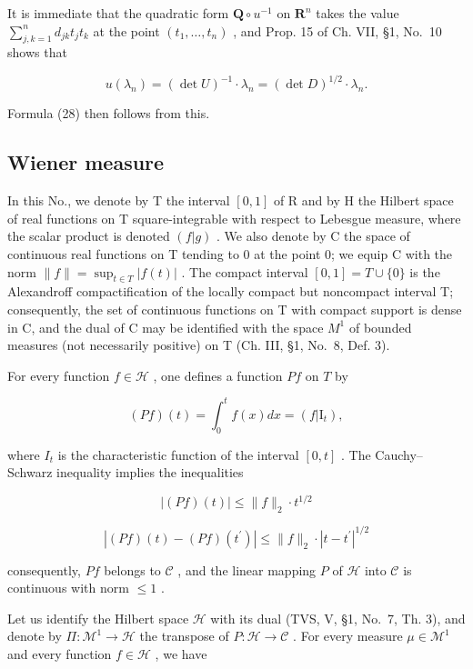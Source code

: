It is immediate that the quadratic form \(\mathbf{Q} \circ u^{-1}\) on \(\mathbf{R}^n\) takes the value \(\sum_{j,k=1}^{n} d_{jk} t_j t_k\) at the point \((t_1, \ldots, t_n)\) , and Prop. 15 of Ch. VII, §1, No.~10 shows that

\[
u (\lambda_ {n}) = (\det U) ^ {- 1} \cdot \lambda_ {n} = (\det D) ^ {1 / 2} \cdot \lambda_ {n}.\tag{30}
\]

Formula (28) then follows from this.

\subsection{Wiener measure}

In this No., we denote by T the interval \([0,1]\) of R and by H the Hilbert space of real functions on T square-integrable with respect to Lebesgue measure, where the scalar product is denoted \((f|g)\) . We also denote by C the space of continuous real functions on T tending to 0 at the point 0; we equip C with the norm \(\|f\| = \sup_{t \in T} |f(t)|\) . The compact interval \([0,1] = T \cup \{0\}\) is the Alexandroff compactification of the locally compact but noncompact interval T; consequently, the set of continuous functions on T with compact support is dense in C, and the dual of C may be identified with the space \(M^{1}\) of bounded measures (not necessarily positive) on T (Ch. III, §1, No.~8, Def. 3).

For every function \(f \in \mathcal{H}\) , one defines a function \(Pf\) on \(T\) by

\[
(P f) (t) = \int_ {0} ^ {t} f (x) d x = (f | \mathrm{I} _ {t}),\tag{31}
\]

where \(I_{t}\) is the characteristic function of the interval \([0, t]\) . The Cauchy--Schwarz inequality implies the inequalities

\[
| (P f) (t) | \leqslant \| f \| _ {2} \cdot t ^ {1 / 2}\tag{32}
\]

\[
\left| (P f) (t) - (P f) \left(t ^ {\prime}\right) \right| \leqslant \| f \| _ {2} \cdot \left| t - t ^ {\prime} \right| ^ {1 / 2}\tag{33}
\]

consequently, \(Pf\) belongs to \(\mathcal{C}\) , and the linear mapping \(P\) of \(\mathcal{H}\) into \(\mathcal{C}\) is continuous with norm \(\leqslant 1\) .

Let us identify the Hilbert space \(\mathcal{H}\) with its dual (TVS, V, §1, No.~7, Th. 3), and denote by \(\Pi : \mathcal{M}^1 \to \mathcal{H}\) the transpose of \(P: \mathcal{H} \to \mathcal{C}\) . For every measure \(\mu \in \mathcal{M}^1\) and every function \(f \in \mathcal{H}\) , we have

